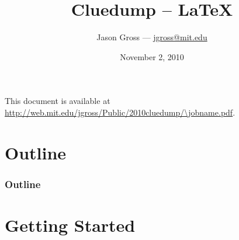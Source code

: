 \documentclass[utf8x]{beamer}
\begin{document}
\title{Cluedump -- \LaTeX}
\date{November 2, 2010}
\author{Jason Gross --- \href{mailto:jgross@mit.edu}{jgross@mit.edu}}

\begin{frame}
  \titlepage
  This document is available at \url{http://web.mit.edu/jgross/Public/2010cluedump/\jobname.pdf}.
\end{frame}

\section*{Outline}
  \begin{frame}
    \frametitle{Outline}
    \tableofcontents[pausesections]
  \end{frame}
\section{Getting Started}
\end{document}
